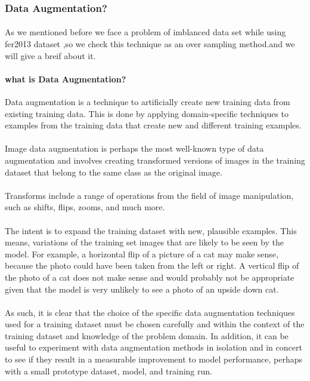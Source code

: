 \subsubsection{Data Augmentation?}
\paragraph{}
As we mentioned before we face a problem of imblanced data set while using fer2013 dataset ,so we check this technique as an over sampling method.and we will give a breif about it.
\paragraph{what is Data Augmentation?}
Data augmentation is a technique to artificially create new training data from existing training data. This is done by applying domain-specific techniques to examples from the training data that create new and different training examples.
\paragraph{}
Image data augmentation is perhaps the most well-known type of data augmentation and involves creating transformed versions of images in the training dataset that belong to the same class as the original image.
\paragraph{}
Transforms include a range of operations from the field of image manipulation, such as shifts, flips, zooms, and much more.
\paragraph{}
The intent is to expand the training dataset with new, plausible examples. This means, variations of the training set images that are likely to be seen by the model. For example, a horizontal flip of a picture of a cat may make sense, because the photo could have been taken from the left or right. A vertical flip of the photo of a cat does not make sense and would probably not be appropriate given that the model is very unlikely to see a photo of an upside down cat.
\paragraph{}
As such, it is clear that the choice of the specific data augmentation techniques used for a training dataset must be chosen carefully and within the context of the training dataset and knowledge of the problem domain. In addition, it can be useful to experiment with data augmentation methods in isolation and in concert to see if they result in a measurable improvement to model performance, perhaps with a small prototype dataset, model, and training run.
